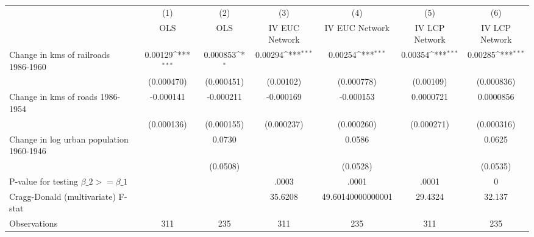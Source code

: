{
\def\sym#1{\ifmmode^{#1}\else\(^{#1}\)\fi}
\begin{tabular}{l*{6}{c}}
\hline\hline
                &\multicolumn{1}{c}{(1)}&\multicolumn{1}{c}{(2)}&\multicolumn{1}{c}{(3)}&\multicolumn{1}{c}{(4)}&\multicolumn{1}{c}{(5)}&\multicolumn{1}{c}{(6)}\\
                &\multicolumn{1}{c}{OLS}&\multicolumn{1}{c}{OLS}&\multicolumn{1}{c}{IV EUC Network}&\multicolumn{1}{c}{IV EUC Network}&\multicolumn{1}{c}{IV LCP Network}&\multicolumn{1}{c}{IV LCP Network}\\
\hline
Change in kms of railroads 1986-1960&  0.00129\sym{***}& 0.000853\sym{*}  &  0.00294\sym{***}&  0.00254\sym{***}&  0.00354\sym{***}&  0.00285\sym{***}\\
                &(0.000470)         &(0.000451)         &(0.00102)         &(0.000778)         &(0.00109)         &(0.000836)         \\
[1em]
Change in kms of roads 1986-1954&-0.000141         &-0.000211         &-0.000169         &-0.000153         &0.0000721         &0.0000856         \\
                &(0.000136)         &(0.000155)         &(0.000237)         &(0.000260)         &(0.000271)         &(0.000316)         \\
[1em]
Change in log urban population 1960-1946&                  &   0.0730         &                  &   0.0586         &                  &   0.0625         \\
                &                  & (0.0508)         &                  & (0.0528)         &                  & (0.0535)         \\
\hline
P-value for testing $\beta\_{2} >= \beta\_{1}$&                  &                  &    .0003         &    .0001         &    .0001         &        0         \\
Cragg-Donald (multivariate) F-stat&                  &                  &  35.6208         &49.60140000000001         &  29.4324         &   32.137         \\
Observations    &      311         &      235         &      311         &      235         &      311         &      235         \\
\hline\hline
\end{tabular}
}
